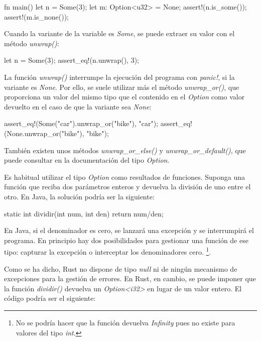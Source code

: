 \vspace{0.7em}
\begin{Codigo}
   fn main() {
      let n = Some(3);
      let m: Option<u32> = None;
      assert!(n.is_some());
      assert!(m.is_none());
   }
\end{Codigo}

Cuando la variante de la variable es \textit{Some}, se puede extraer su valor con el método \textit{unwrap()}:

\vspace{0.7em}
\begin{Codigo}
   let n = Some(3);
   assert_eq!(n.unwrap(), 3);
\end{Codigo}

La función \textit{unwrap()} interrumpe la ejecución del programa con \textit{panic!}, si la variante es \textit{None}. Por ello, se suele utilizar más el método \textit{unwrap\_or()}, que proporciona un valor del mismo tipo que el contenido en el \textit{Option} como valor devuelto en el caso de que la variante sea \textit{None}:

\vspace{0.7em}
\begin{Codigo}
   assert_eq!(Some("car").unwrap_or("bike"), "car");
   assert_eq!(None.unwrap_or("bike"), "bike");
\end{Codigo}

También existen unos métodos \textit{unwrap\_or\_else()} y \textit{unwrap\_or\_default()}, que puede consultar en la documentación del tipo \textit{Option}.

Es habitual utilizar el tipo \textit{Option} como resultados de funciones. Suponga una función que reciba dos parámetros enteros y devuelva la división de uno entre el otro. En Java, la solución podría ser la siguiente:

\vspace{0.7em}
\begin{Codigo}
   static int dividir(int num, int den) {
      return num/den;
   }
\end{Codigo}

En Java, si el denominador es cero, se lanzará una excepción y se interrumpirá el programa. En principio hay dos posibilidades para gestionar una función de ese tipo: capturar la excepción o interceptar los denominadores cero. \footnote{No se podría hacer que la función devuelva \textit{Infinity} pues no existe para valores del tipo \textit{int}.}.

Como se ha dicho, Rust no dispone de tipo \textit{null} ni de ningún mecanismo de excepciones para la gestión de errores. En Rust, en cambio, se puede imponer que la función \textit{dividir()} devuelva un \textit{Option<i32>} en lugar de un valor entero. El código podría ser el siguiente:

